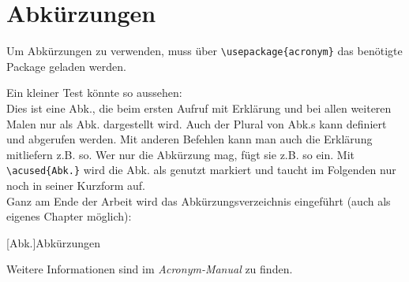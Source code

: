 
\chapter{Abkürzungen}

Um Abkürzungen zu verwenden, muss über \lstinline|\usepackage{acronym}| das benötigte Package geladen werden.

Ein kleiner Test könnte so aussehen: \\

Dies ist eine \ac{Abk.}, die beim ersten Aufruf mit Erklärung und bei allen weiteren Malen nur als \ac{Abk.} dargestellt wird. Auch der Plural von \aclp{Abk.} kann definiert und abgerufen werden. Mit anderen Befehlen kann man auch die Erklärung mitliefern \acf{z.B.} so. Wer nur die Abkürzung mag, fügt sie \acs{z.B.} so ein. Mit \lstinline|\acused{Abk.}| wird die \acl{Abk.} als genutzt markiert und taucht im Folgenden nur noch in seiner Kurzform auf. \\
 
 Ganz am Ende der Arbeit wird das Abkürzungsverzeichnis eingeführt (auch als eigenes Chapter möglich): 

\begin{acronym}
 	[Abk.]{Abkürzungen}
\end{acronym}

Weitere Informationen sind im \textit{Acronym-Manual} zu finden.